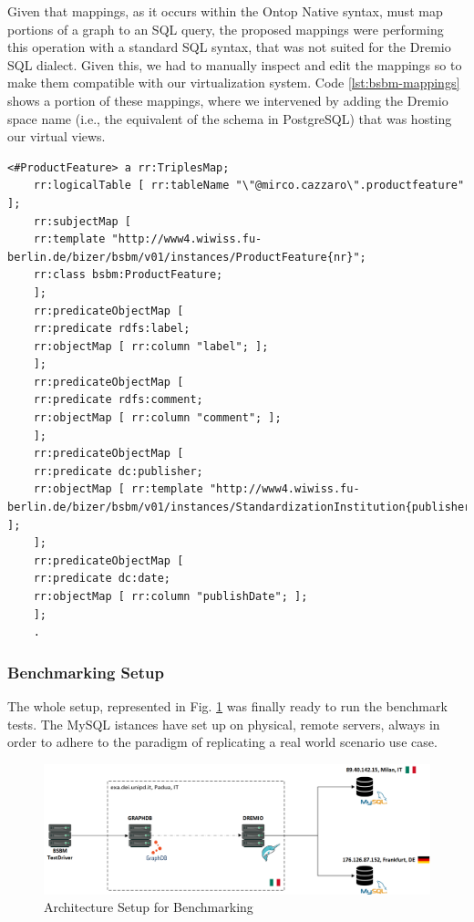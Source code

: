 Given that mappings, as it occurs within the Ontop Native syntax, must map portions of a graph to an \ac{SQL} query, the proposed mappings were performing this operation with a standard \ac{SQL} syntax, that was not suited for the Dremio \ac{SQL} dialect. Given this, we had to manually inspect and edit the mappings so to make them compatible with our virtualization system. Code \ref{lst:bsbm-mappings} shows a portion of these mappings, where we intervened by adding the Dremio space name (i.e., the equivalent of the schema in PostgreSQL) that was hosting our virtual views.
\begin{lstlisting}[language=R2RML, caption={BSBM Custom Mappings for Dremio \ac{SQL} Syntax in R2RML}, label={lst:bsbm-mappings}]
    <#ProductFeature> a rr:TriplesMap;
    rr:logicalTable [ rr:tableName "\"@mirco.cazzaro\".productfeature" ];
    rr:subjectMap [
    rr:template "http://www4.wiwiss.fu-berlin.de/bizer/bsbm/v01/instances/ProductFeature{nr}";
    rr:class bsbm:ProductFeature;
    ];
    rr:predicateObjectMap [
    rr:predicate rdfs:label;
    rr:objectMap [ rr:column "label"; ];
    ];
    rr:predicateObjectMap [
    rr:predicate rdfs:comment;
    rr:objectMap [ rr:column "comment"; ];
    ];
    rr:predicateObjectMap [
    rr:predicate dc:publisher;
    rr:objectMap [ rr:template "http://www4.wiwiss.fu-berlin.de/bizer/bsbm/v01/instances/StandardizationInstitution{publisher}"; ];
    ];
    rr:predicateObjectMap [
    rr:predicate dc:date;
    rr:objectMap [ rr:column "publishDate"; ];
    ];
    .
\end{lstlisting}

\subsubsection{Benchmarking Setup}
The whole setup, represented in Fig. \ref{fig:benchmark-setup} was finally ready to run the benchmark tests. The MySQL istances have set up on physical, remote servers, always in order to adhere to the paradigm of replicating a real world scenario use case.
\begin{figure}[ht]
    \centering
    \includegraphics[width=16cm]{res/benchmark-setup.png}
    \caption{Architecture Setup for Benchmarking}
    \label{fig:benchmark-setup}
\end{figure}

